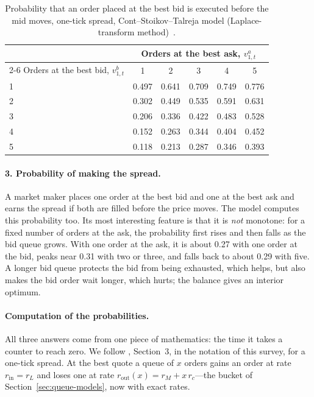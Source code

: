 \begin{table}[!htbp]
\centering\footnotesize
\caption{Probability that an order placed at the best bid is executed before the mid moves, one-tick
spread, Cont--Stoikov--Talreja model (Laplace-transform method)~\citep{cst2010}.}
\label{tab:cst-fill}
\begin{tabular}{lccccc}
\toprule
& \multicolumn{5}{c}{Orders at the best ask, $v^a_{1,t}$} \\
\cmidrule(lr){2-6}
Orders at the best bid, $v^b_{1,t}$ & 1 & 2 & 3 & 4 & 5 \\
\midrule
1 & 0.497 & 0.641 & 0.709 & 0.749 & 0.776 \\
2 & 0.302 & 0.449 & 0.535 & 0.591 & 0.631 \\
3 & 0.206 & 0.336 & 0.422 & 0.483 & 0.528 \\
4 & 0.152 & 0.263 & 0.344 & 0.404 & 0.452 \\
5 & 0.118 & 0.213 & 0.287 & 0.346 & 0.393 \\
\bottomrule
\end{tabular}
\end{table}

\paragraph{3. Probability of making the spread.} A market maker places one order at the best bid and one at
the best ask and earns the spread if both are filled before the price moves. The model computes this
probability too. Its most interesting feature is that it is \emph{not} monotone: for a fixed number of
orders at the ask, the probability first rises and then falls as the bid queue grows. With one order at
the ask, it is about 0.27 with one order at the bid, peaks near 0.31 with two or three, and falls back
to about 0.29 with five. A longer bid queue protects the bid from being exhausted, which helps, but also
makes the bid order wait longer, which hurts; the balance gives an interior optimum.

\paragraph{Computation of the probabilities.} All three answers come from one piece of mathematics: the
time it takes a counter to reach zero. We follow \citet{cst2010}, Section~3, in the notation of this
survey, for a one-tick spread. At the best quote a queue of $x$ orders gains an order at rate
$r_{\text{in}} = r_L$ and loses one at rate $r_{\text{out}}(x) = r_M + x\,r_c$---the bucket of
Section~\ref{sec:queue-models}, now with exact rates.

